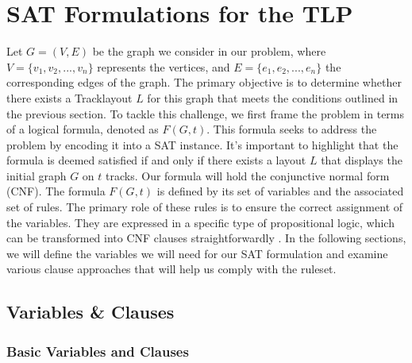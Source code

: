 \documentclass[bachelor, english]{algothesis}
\begin{document}
\chapter{SAT Formulations for the TLP}
Let $G = (V,E)$ be the graph we consider in our problem, where $V =\{v_1,v_2,...,v_n\}$ represents the vertices, and $E = \{e_1,e_2,...,e_n\}$ the corresponding edges of the graph. The primary objective is to determine whether there exists a Tracklayout $L$ for this graph that meets the conditions outlined in the previous section. To tackle this challenge, we first frame the problem in terms of a logical formula, denoted as $F(G, t)$. This formula seeks to address the problem by encoding it into a SAT instance. It's important to highlight that the formula is deemed satisfied if and only if there exists a layout $L$ that displays the initial graph $G$ on $t$ tracks. Our formula will hold the conjunctive normal form (CNF). The formula $F(G, t)$ is defined by its set of variables and the associated set of rules. The primary role of these rules is to ensure the correct assignment of the variables. They are expressed in a specific type of propositional logic, which can be  transformed into CNF clauses straightforwardly \cite{conjunction}. In the following sections, we will define the variables we will need for our SAT formulation and examine various clause approaches that will help us comply with the ruleset.

\section{Variables \& Clauses}
\label{sec:vars_clauses}
\subsection{Basic Variables and Clauses}
\label{sec:basic_clauses}
\end{document}
